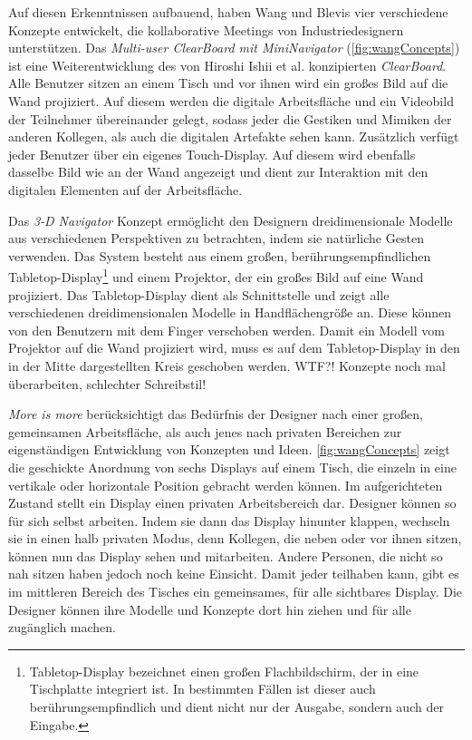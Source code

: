 Auf diesen Erkenntnissen aufbauend, haben Wang und Blevis \citep{Wang:2004p110} vier verschiedene Konzepte entwickelt, die kollaborative Meetings von Industriedesignern unterstützen. Das \emph{Multi-user ClearBoard mit MiniNavigator} (\autoref{fig:wangConcepts}) ist eine Weiterentwicklung des von Hiroshi Ishii et al. konzipierten \emph{ClearBoard}\citep{Ishii:1994p243}. Alle Benutzer sitzen an einem Tisch und vor ihnen wird ein großes Bild auf die Wand projiziert. Auf diesem werden die digitale Arbeitsfläche und ein Videobild der Teilnehmer übereinander gelegt, sodass jeder die Gestiken und Mimiken der anderen Kollegen, als auch die digitalen Artefakte sehen kann. Zusätzlich verfügt jeder Benutzer über ein eigenes Touch-Display. Auf diesem wird ebenfalls dasselbe Bild wie an der Wand angezeigt und dient zur Interaktion mit den digitalen Elementen auf der Arbeitsfläche.

Das \emph{3-D Navigator} Konzept ermöglicht den Designern dreidimensionale Modelle aus verschiedenen Perspektiven zu betrachten, indem sie natürliche Gesten verwenden. Das System besteht aus einem großen, berührungsempfindlichen Tabletop-Display\footnote{Tabletop-Display bezeichnet einen großen Flachbildschirm, der in eine Tischplatte integriert ist. In bestimmten Fällen ist dieser auch berührungsempfindlich und dient nicht nur der Ausgabe, sondern auch der Eingabe.} und einem Projektor, der ein großes Bild auf eine Wand projiziert. Das Tabletop-Display dient als Schnittstelle und zeigt alle verschiedenen dreidimensionalen Modelle in Handflächengröße an. Diese können von den Benutzern mit dem Finger verschoben werden. Damit ein Modell vom Projektor auf die Wand projiziert wird, muss es auf dem Tabletop-Display in den in der Mitte dargestellten Kreis geschoben werden. \color{red}WTF?! Konzepte noch mal überarbeiten, schlechter Schreibstil! \color{black}

\emph{More is more} berücksichtigt das Bedürfnis der Designer nach einer großen, gemeinsamen Arbeitsfläche, als auch jenes nach privaten Bereichen zur eigenständigen Entwicklung von Konzepten und Ideen. \autoref{fig:wangConcepts} zeigt die geschickte Anordnung von sechs Displays auf einem Tisch, die einzeln in eine vertikale oder horizontale Position gebracht werden können. Im aufgerichteten Zustand stellt ein Display einen privaten Arbeitsbereich dar. Designer können so für sich selbst arbeiten. Indem sie dann das Display hinunter klappen, wechseln sie in einen halb privaten Modus, denn Kollegen, die neben oder vor ihnen sitzen, können nun das Display sehen und mitarbeiten. Andere Personen, die nicht so nah sitzen haben jedoch noch keine Einsicht. Damit jeder teilhaben kann, gibt es im mittleren Bereich des Tisches ein gemeinsames, für alle sichtbares Display. Die Designer können ihre Modelle und Konzepte dort hin ziehen und für alle zugänglich machen.

